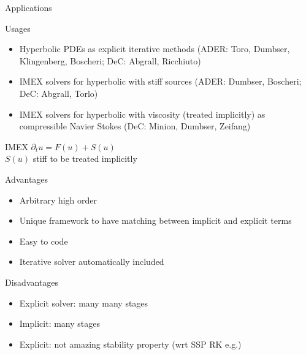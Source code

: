 \documentclass[9pt,compress,t,aspectratio=169]{beamer}
\begin{document}
\begin{frame}{Applications}
	\begin{minipage}{0.48\textwidth}
		\begin{block}{Usages}
			\begin{itemize}
				\item Hyperbolic PDEs as explicit iterative methods
				 (ADER: Toro, Dumbser, Klingenberg, Boscheri; DeC: Abgrall, Ricchiuto)
				\item IMEX solvers for hyperbolic with stiff sources (ADER: Dumbser, Boscheri; DeC: Abgrall, Torlo)
				\item IMEX solvers for hyperbolic with viscosity (treated implicitly) as compressible Navier Stokes (DeC: Minion, Dumbser, Zeifang)
			\end{itemize}
		\end{block}
		\begin{block}{IMEX}
			$\partial_t u = F(u) + S(u)$ \\ $S(u)$ stiff to be treated implicitly
		\end{block}
	\end{minipage}\hfill
	\begin{minipage}{0.48\textwidth}
		\begin{block}{Advantages}
			\begin{itemize}
				\item Arbitrary high order
				\item Unique framework to have matching between implicit and explicit terms
				\item Easy to code
				\item Iterative solver automatically included
			\end{itemize}
		\end{block}

		\begin{block}{Disadvantages}
			\begin{itemize}
				\item Explicit solver: many many stages
				\item Implicit: many stages
				\item Explicit: not amazing stability property (wrt SSP RK e.g.)
			\end{itemize}
		\end{block}
	\end{minipage}
\end{frame}
\end{document}
